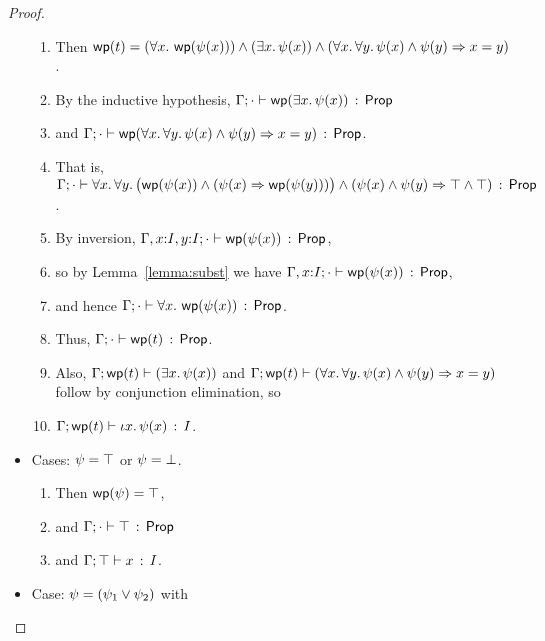 \documentclass[11pt]{article}
\begin{document}
\begin{proof}
\begin{itemize}
    \begin{enumerate}
      \item Then
        $\mathop{\mathsf{wp}}(t) = 
        (\forall x.\, \mathop{\mathsf{wp}}(\psi(x))) \wedge (\exists x.\, \psi(x)) \wedge (\forall x.\, \forall y.\, \psi(x) \wedge \psi(y) \Rightarrow x=y)$.
      \item 
        By the inductive hypothesis, $\Gamma;\cdot \vdash \mathop{\mathsf{wp}}(\exists x.\, \psi(x))\, :\, \mathsf{Prop}$
      \item 
      	and
        $\Gamma;\cdot \vdash \mathop{\mathsf{wp}}(\forall x.\, \forall y.\, \psi(x) \wedge \psi(y) \Rightarrow x=y)\, :\, \mathsf{Prop}$.
      \item
      	That is, 
	$\Gamma;\cdot \vdash \forall x.\, \forall y.\, \bigl(\mathop{\mathsf{wp}}(\psi(x)) \wedge (\psi(x) \Rightarrow \mathop{\mathsf{wp}}(\psi(y)))\bigr) \wedge (\psi(x) \wedge \psi(y) \Rightarrow \top \wedge \top)\, :\, \mathsf{Prop}$.
	  \item
	    By inversion, 
	      $\Gamma,x{:}I,y{:}I;\cdot \vdash \mathop{\mathsf{wp}}(\psi(x))\, :\, \mathsf{Prop}$,
      \item 
        so by Lemma~\ref{lemma:subst} we have 
        $\Gamma,x{:}I;\cdot \vdash \mathop{\mathsf{wp}}(\psi(x))\, :\, \mathsf{Prop}$,
      \item
        and hence $\Gamma;\cdot \vdash \forall x.\, \mathop{\mathsf{wp}}(\psi(x))\, :\, \mathsf{Prop}$.
      \item
        Thus, $\Gamma;\cdot \vdash \mathop{\mathsf{wp}}(t)\, :\, \mathsf{Prop}$.
      \item
        Also, $\Gamma;\mathop{\mathsf{wp}}(t) \vdash (\exists x.\, \psi(x))$
        and $\Gamma;\mathop{\mathsf{wp}}(t) \vdash (\forall x.\, \forall y.\, \psi(x) \wedge \psi(y) \Rightarrow x=y)$
        follow by conjunction elimination, so
      \item
        $\Gamma;\mathop{\mathsf{wp}}(t) \vdash \iota x.\, \psi(x)\, :\, I$.
      \end{enumerate}
  \item Cases: $\psi = \top$ or $\psi = \bot$.
      \begin{enumerate}
      \item 
      	Then $\mathop{\mathsf{wp}}(\psi) = \top$,
      \item
        and $\Gamma;\cdot \vdash \top\, :\, \mathsf{Prop}$ 
      \item
        and $\Gamma;\top \vdash x\, :\, I$.
      \end{enumerate}
  \item Case: $\psi = (\psi_1 \vee \psi_2)$ with

\end{itemize}
\end{proof}
\end{document}
